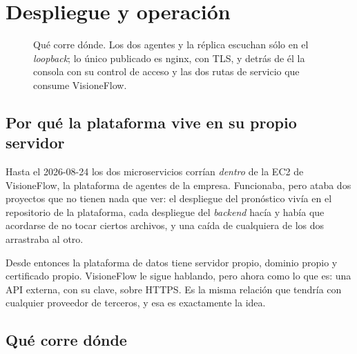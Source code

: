 \section{Despliegue y operación}

\begin{figure}[htbp]
\centering
\resizebox{0.96\textwidth}{!}{}
\caption{Qué corre dónde. Los dos agentes y la réplica escuchan sólo en el
\emph{loopback}; lo único publicado es nginx, con TLS, y detrás de él la consola con su
control de acceso y las dos rutas de servicio que consume VisioneFlow.}
\end{figure}

\subsection{Por qué la plataforma vive en su propio servidor}

Hasta el 2026-08-24 los dos microservicios corrían \emph{dentro} de la EC2 de VisioneFlow,
la plataforma de agentes de la empresa. Funcionaba, pero ataba dos proyectos que no
tienen nada que ver: el despliegue del pronóstico vivía en el repositorio de la
plataforma, cada despliegue del \emph{backend} hacía  y había que
acordarse de no tocar ciertos archivos, y una caída de cualquiera de los dos arrastraba
al otro.

Desde entonces la plataforma de datos tiene servidor propio, dominio propio y
certificado propio. VisioneFlow le sigue hablando, pero ahora como lo que es: una API
externa, con su clave, sobre HTTPS. Es la misma relación que tendría con cualquier
proveedor de terceros, y esa es exactamente la idea.

\subsection{Qué corre dónde}

